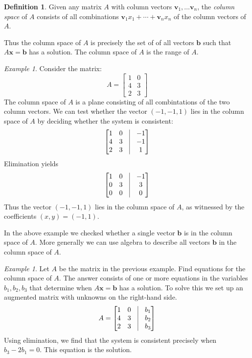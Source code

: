 \documentclass[11pt,oneside]{amsbook}
\theoremstyle{definition}
\theoremstyle{plain}
\theoremstyle{definition}
\newtheorem{definition}[theorem]{Definition}
\theoremstyle{remark}
\newtheorem{example}[theorem]{Example}
\numberwithin{equation}{section}
\numberwithin{figure}{section}
\begin{document}
\begin{definition}
  Given any matrix $A$ with column vectors $\mathbf{v}_1,\ldots\mathbf{v}_n$, the \emph{column space} of $A$ consists of all combinations $\mathbf{v}_1x_1+\cdots+\mathbf{v}_nx_n$ of the column vectors of $A$.
\end{definition}

Thus the column space of $A$ is precisely the set of of all vectors $\mathbf{b}$ such that $A\mathbf{x}=\mathbf{b}$ has a solution. The column space of $A$ is the range of $A$.

\begin{example}
  Consider the matrix:
  \[A=\begin{bmatrix}1&0\\4&3\\2&3\end{bmatrix}
  \]
  The column space of $A$ is a plane consisting of all combintations of the two column vectors. We can test whether the vector $(-1,-1,1)$ lies in the column space of $A$ by deciding whether the system is consistent:
  \[\begin{bmatrix}1&0&\vline&-1\\4&3&\vline&-1\\2&3&\vline&1\end{bmatrix}
  \]
  Elimination yields
  \[\begin{bmatrix}1&0&\vline&-1\\0&3&\vline&3\\0&0&\vline&0\end{bmatrix}
  \]  
  Thus the vector $(-1,-1,1)$ lies in the column space of $A$, as witnessed by the coefficients $(x,y)=(-1,1)$.
\end{example}

In the above example we checked whether a single vector $\mathbf{b}$ is in the column space of $A$. More generally we can use algebra to describe all vectors $\mathbf{b}$ in the column space of $A$.

\begin{example}
  Let $A$ be the matrix in the previous example. Find equations for the column space of $A$. The answer consists of one or more equations in the variables $b_1,b_2,b_3$ that determine when $A\mathbf{x}=\mathbf{b}$ has a solution. To solve this we set up an augmented matrix with unknowns on the right-hand side.
  \[A=\begin{bmatrix}
      1&0&\vline&b_1\\
      4&3&\vline&b_2\\
      2&3&\vline&b_3\\
    \end{bmatrix}
  \]
  Using elimination, we find that the system is consistent precisely when $b_3-2b_1=0$. This equation is the solution.
\end{example}
\end{document}
